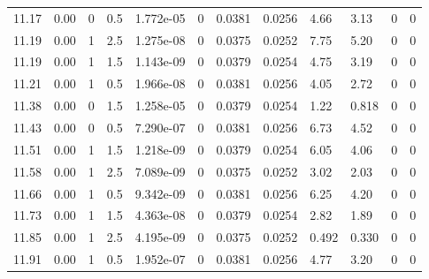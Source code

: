 \documentclass[preview]{standalone}
\begin{document}
{{{{\begin{tabular}{L{1.2cm}C{1.2cm} C{0.3cm}C{0.5cm} C{1.4cm}C{1.4cm} C{1.4cm}C{1.4cm} C{1.6cm}C{1.6cm} C{1.6cm}C{1.6cm}}
  11.17  &  0.00  & 0     & 0.5 &  1.772e-05  & 0  &  0.0381&   0.0256& 4.66 & 3.13   &  0 & 0  \\ 
  11.19  &  0.00  & 1     & 2.5 &  1.275e-08  & 0  &  0.0375&   0.0252& 7.75 & 5.20   &  0 & 0  \\ 
  11.19  &  0.00  & 1     & 1.5 &  1.143e-09  & 0  &  0.0379&   0.0254& 4.75 & 3.19   &  0 & 0  \\ 
  11.21  &  0.00  & 1     & 0.5 &  1.966e-08  & 0  &  0.0381&   0.0256& 4.05 & 2.72   &  0 & 0  \\ 
  11.38  &  0.00  & 0     & 1.5 &  1.258e-05  & 0  &  0.0379&   0.0254& 1.22 & 0.818   &  0 & 0  \\ 
  11.43  &  0.00  & 0     & 0.5 &  7.290e-07  & 0  &  0.0381&   0.0256& 6.73 & 4.52   &  0 & 0  \\ 
  11.51  &  0.00  & 1     & 1.5 &  1.218e-09  & 0  &  0.0379&   0.0254& 6.05 & 4.06   &  0 & 0  \\ 
  11.58  &  0.00  & 1     & 2.5 &  7.089e-09  & 0  &  0.0375&   0.0252& 3.02 & 2.03   &  0 & 0  \\ 
  11.66  &  0.00  & 1     & 0.5 &  9.342e-09  & 0  &  0.0381&   0.0256& 6.25 & 4.20   &  0 & 0  \\ 
  11.73  &  0.00  & 1     & 1.5 &  4.363e-08  & 0  &  0.0379&   0.0254& 2.82 & 1.89   &  0 & 0  \\ 
  11.85  &  0.00  & 1     & 2.5 &  4.195e-09  & 0  &  0.0375&   0.0252& 0.492 & 0.330   &  0 & 0  \\ 
  11.91  &  0.00  & 1     & 0.5 &  1.952e-07  & 0  &  0.0381&   0.0256& 4.77 & 3.20   &  0 & 0  \\ 
\hline 
\end{tabular} 

}}}}
\end{document}
